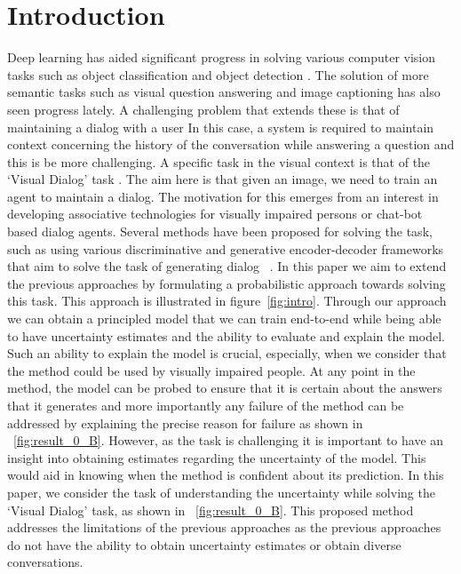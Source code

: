 \documentclass[review]{elsarticle}
\begin{document}
\section{Introduction}\label{intro}

Deep learning has aided significant progress in solving various computer vision tasks such as object classification \cite{Simonyan_arXiv2014,he_CVPR2016deep} and object detection \cite{ren_NIPS2015faster,zhao_TNNLS2019object}. The solution of more semantic tasks such as visual question answering \cite{VQA,goyal_CVPR2017making} and image captioning \cite{Vinyals_CVPR2015,Karpathy_CVPR2015} has also seen progress lately. A challenging problem that extends these is that of maintaining a dialog with a user \cite{Das_ICCV2017,Das_CVPR2017} In this case, a system is required to maintain context concerning the history of the conversation while answering a question and this is be more challenging. A specific task in the visual context is that of the `Visual Dialog' task \cite{Das_CVPR2017}. The aim here is that given an image, we need to train an agent to maintain a dialog. The motivation for this emerges from an interest in developing associative technologies for visually impaired persons or chat-bot based dialog agents. Several methods have been proposed for solving the task, such as using various discriminative and generative encoder-decoder frameworks that aim to solve the task of generating dialog ~\cite{Das_CVPR2017, Das_ICCV2017}. In this paper we aim to extend the previous approaches by formulating a probabilistic approach towards solving this task. This approach is illustrated in figure~\ref{fig:intro}. Through our approach we can obtain a principled model that we can train end-to-end while being able to have uncertainty estimates and the ability to evaluate and explain the model. Such an ability to explain the model is crucial, especially, when we consider that the method could be used by visually impaired people. At any point in the method, the model can be probed to ensure that it is certain about the answers that it generates and more importantly any failure of the method can be addressed by explaining the precise reason for failure as shown in ~\ref{fig:result_0_B}. However, as the task is challenging it is important to have an insight into obtaining estimates regarding the uncertainty of the model. This would aid in knowing when the method is confident about its prediction. In this paper, we consider the task of understanding the uncertainty while solving the `Visual Dialog' task, as shown in ~\ref{fig:result_0_B}. This proposed method addresses the limitations of the previous approaches as the previous approaches do not have the ability to obtain uncertainty estimates or obtain diverse conversations. 
\end{document}
